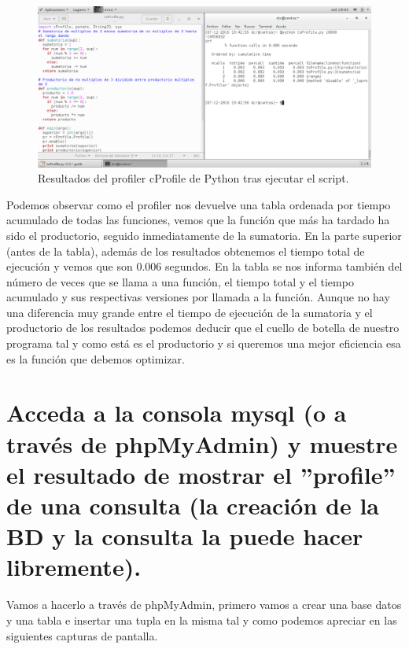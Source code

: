 \begin{figure}[H]
	\centering
	\includegraphics[scale=0.4]{pythonProfile.png}
	\caption{Resultados del profiler cProfile de Python tras ejecutar el script.}
\end{figure}

Podemos observar como el profiler nos devuelve una tabla ordenada por tiempo acumulado de todas las funciones, vemos que la función que más ha tardado ha sido el productorio, seguido inmediatamente de la sumatoria. En la parte superior (antes de la tabla), además de los resultados obtenemos el tiempo total de ejecución y vemos que son 0.006 segundos. En la tabla se nos informa también del número de veces que se llama a una función, el tiempo total y el tiempo acumulado y sus respectivas versiones por llamada a la función. Aunque no hay una diferencia muy grande entre el tiempo de ejecución de la sumatoria y el productorio de los resultados podemos deducir que el cuello de botella de nuestro programa tal y como está es el productorio y si queremos una mejor eficiencia esa es la función que debemos optimizar.

\section{Acceda a la consola mysql (o a través de phpMyAdmin) y muestre el resultado de mostrar el ”profile” de una consulta (la creación de la BD y la consulta la puede hacer libremente).}
Vamos a hacerlo a través de phpMyAdmin, primero vamos a crear una base datos y una tabla e insertar una tupla en la misma tal y como podemos apreciar en las siguientes capturas de pantalla. \cite{c9}

